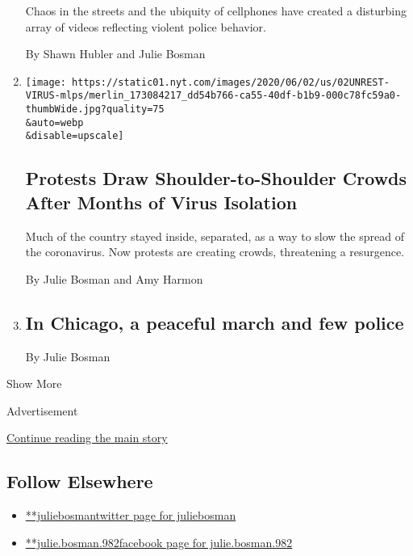 \begin{enumerate}
  Chaos in the streets and the ubiquity of cellphones have created a
  disturbing array of videos reflecting violent police behavior.

  By Shawn Hubler and Julie Bosman
\item
  \href{/2020/06/02/us/coronavirus-protests-george-floyd.html}{}

  \texttt{[image: https://static01.nyt.com/images/2020/06/02/us/02UNREST-VIRUS-mlps/merlin\_173084217\_dd54b766-ca55-40df-b1b9-000c78fc59a0-thumbWide.jpg?quality=75\\\&auto=webp\\\&disable=upscale]}

  \hypertarget{protests-draw-shoulder-to-shoulder-crowds-after-months-of-virus-isolation}{%
  \subsection{Protests Draw Shoulder-to-Shoulder Crowds After Months of
  Virus
  Isolation}\label{protests-draw-shoulder-to-shoulder-crowds-after-months-of-virus-isolation}}

  Much of the country stayed inside, separated, as a way to slow the
  spread of the coronavirus. Now protests are creating crowds,
  threatening a resurgence.

  By Julie Bosman and Amy Harmon
\item
  \href{/live/2020/george-floyd-protests-today-06-01/in-chicago-a-peaceful-march-and-few-police}{}

  \hypertarget{in-chicago-a-peaceful-march-and-few-police}{%
  \subsection{In Chicago, a peaceful march and few
  police}\label{in-chicago-a-peaceful-march-and-few-police}}

  By Julie Bosman
\end{enumerate}

Show More

Advertisement

\protect\hyperlink{after-mid2}{Continue reading the main story}

\hypertarget{follow-elsewhere}{%
\subsection{Follow Elsewhere}\label{follow-elsewhere}}

\begin{itemize}
\tightlist
\item
  \href{https://twitter.com/juliebosman}{**juliebosmantwitter page for
  juliebosman}
\item
  \href{https://www.facebook.com/julie.bosman.982}{**julie.bosman.982facebook
  page for julie.bosman.982}
\end{itemize}

